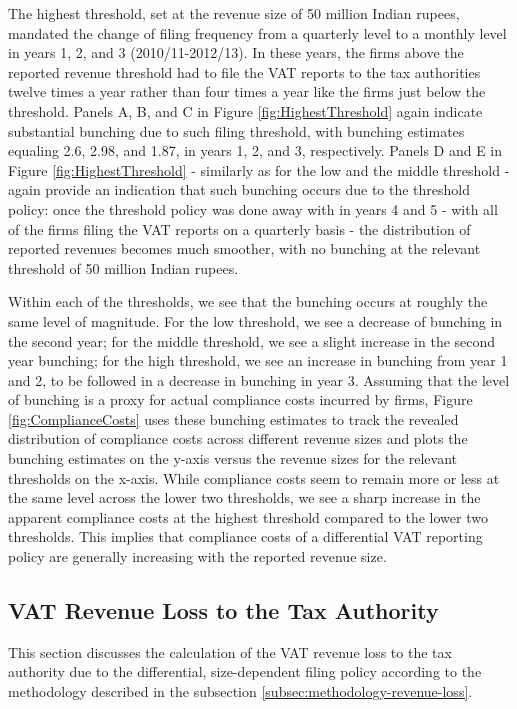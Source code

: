 The highest threshold, set at the revenue size of 50 million Indian
rupees, mandated the change of filing frequency from a quarterly level
to a monthly level in years 1, 2, and 3 (2010/11-2012/13). In these
years, the firms above the reported revenue threshold had to file
the VAT reports to the tax authorities twelve times a year rather
than four times a year like the firms just below the threshold. Panels
A, B, and C in Figure \ref{fig:HighestThreshold} again indicate substantial
bunching due to such filing threshold, with bunching estimates equaling
2.6, 2.98, and 1.87, in years 1, 2, and 3, respectively. Panels D
and E in Figure \ref{fig:HighestThreshold} - similarly as for the
low and the middle threshold - again provide an indication that such
bunching occurs due to the threshold policy: once the threshold policy
was done away with in years 4 and 5 - with all of the firms filing
the VAT reports on a quarterly basis - the distribution of reported
revenues becomes much smoother, with no bunching at the relevant threshold
of 50 million Indian rupees.

Within each of the thresholds, we see that the bunching occurs at
roughly the same level of magnitude. For the low threshold, we see
a decrease of bunching in the second year; for the middle threshold,
we see a slight increase in the second year bunching; for the high
threshold, we see an increase in bunching from year 1 and 2, to be
followed in a decrease in bunching in year 3. Assuming that the level
of bunching is a proxy for actual compliance costs incurred by firms,
Figure \ref{fig:ComplianceCosts} uses these bunching estimates to
track the revealed distribution of compliance costs across different
revenue sizes and plots the bunching estimates on the y-axis versus
the revenue sizes for the relevant thresholds on the x-axis. While
compliance costs seem to remain more or less at the same level across
the lower two thresholds, we see a sharp increase in the apparent
compliance costs at the highest threshold compared to the lower two
thresholds. This implies that compliance costs of a differential VAT
reporting policy are generally increasing with the reported revenue
size.

\subsection{VAT Revenue Loss to the Tax Authority}
\label{subsec:3-results-revenue-loss}
This section discusses the calculation of the VAT revenue loss to
the tax authority due to the differential, size-dependent filing policy
according to the methodology described in the subsection \cref{subsec:methodology-revenue-loss}.

